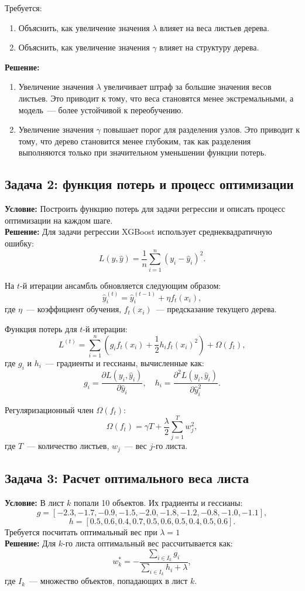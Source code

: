 Требуется:
\begin{enumerate}
    \item Объяснить, как увеличение значения $\lambda$ влияет на веса листьев дерева.
    \item Объяснить, как увеличение значения $\gamma$ влияет на структуру дерева.
\end{enumerate}

\textbf{Решение:}
\begin{enumerate}
    \item Увеличение значения $\lambda$ увеличивает штраф за большие значения весов листьев. Это приводит к тому, что веса становятся менее экстремальными, а модель~--- более устойчивой к переобучению.
    \item Увеличение значения $\gamma$ повышает порог для разделения узлов. Это приводит к тому, что дерево становится менее глубоким, так как разделения выполняются только при значительном уменьшении функции потерь.
\end{enumerate}

\subsection*{Задача 2: функция потерь и процесс оптимизации}
\textbf{Условие:} Построить функцию потерь для задачи регрессии и описать процесс оптимизации на каждом шаге.
\\
\textbf{Решение:} Для задачи регрессии XGBoost использует среднеквадратичную ошибку:
\[
    L(y, \hat{y}) = \frac{1}{n} \sum_{i=1}^n (y_i - \hat{y}_i)^2.
\]

На $t$-й итерации ансамбль обновляется следующим образом:
\[
    \hat{y}_i^{(t)} = \hat{y}_i^{(t-1)} + \eta f_t(x_i),
\]
где $\eta$~--- коэффициент обучения, $f_t(x_i)$~--- предсказание текущего дерева.

Функция потерь для $t$-й итерации:
\[
    L^{(t)} = \sum_{i=1}^n \left( g_i f_t(x_i) + \frac{1}{2} h_i f_t(x_i)^2 \right) + \Omega(f_t),
\]
где $g_i$ и $h_i$~--- градиенты и гессианы, вычисленные как:
\[
    g_i = \frac{\partial L(y_i, \hat{y}_i)}{\partial \hat{y}_i}, \quad h_i = \frac{\partial^2 L(y_i, \hat{y}_i)}{\partial \hat{y}_i^2}.
\]

Регуляризационный член $\Omega(f_t)$:
\[
    \Omega(f_t) = \gamma T + \frac{\lambda}{2} \sum_{j=1}^T w_j^2,
\]
где $T$~--- количество листьев, $w_j$~--- вес $j$-го листа.

\subsection*{Задача 3: Расчет оптимального веса листа}
\textbf{Условие:} В лист $k$ попали 10 объектов. Их градиенты и гессианы:
\[
    g = [-2.3, -1.7, -0.9, -1.5, -2.0, -1.8, -1.2, -0.8, -1.0, -1.1],
\]
\[
    h = [0.5, 0.6, 0.4, 0.7, 0.5, 0.6, 0.5, 0.4, 0.5, 0.6].
\]
Требуется посчитать оптимальный вес при $\lambda = 1$
\\
\textbf{Решение:} Для $k$-го листа оптимальный вес рассчитывается как:
\[
    w_k^* = -\frac{\sum_{i \in I_k} g_i}{\sum_{i \in I_k} h_i + \lambda},
\]
где $I_k$~--- множество объектов, попадающих в лист $k$.

